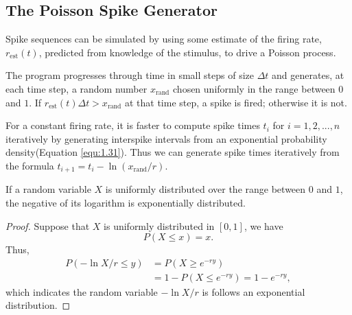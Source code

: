 \subsection{The Poisson Spike Generator}

\begin{rul}%
    Spike sequences can be simulated by using some estimate of the firing rate, $r_\text{est}(t)$, predicted from knowledge of the stimulus,  to drive a Poisson process.
\end{rul}

\begin{alg}
    The program progresses through time in small steps of size $\Delta t$ and generates, at each time step, a random number $x_{\text{rand}}$ chosen uniformly in the range between $0$ and $1$. If $r_{\text{est}}(t)\Delta t > x_{\text{rand}}$ at that time step, a spike is fired; otherwise it is not.
\end{alg}

\begin{alg}
  \label{alg:generator2}
  For a constant firing rate, it is faster to compute spike times $t_i$ for $i=1,2,...,n$ iteratively by generating interspike intervals from an exponential probability density(Equation \ref{equ:1.31}). Thus  we can generate spike times iteratively from the formula $t_{i+1}= t_i-\ln(x_\text{rand}/r)$.
  
\end{alg}
\begin{prop}
  If a random variable $X$ is uniformly distributed over the range between $0$ and $1$, the negative of its logarithm is exponentially distributed.
\end{prop}
\begin{proof}
  Suppose that $X$ is uniformly distributed in $[0,1]$, we have
  \begin{displaymath}
    P(X\leq x) = x.
  \end{displaymath}
  Thus,
  \begin{displaymath}
    \begin{aligned}
      P(-\ln X/r \leq y) &= P(X\geq e^{-ry}) \\
      &= 1 - P(X\leq e^{-ry}) = 1-e^{-ry},
    \end{aligned}
  \end{displaymath}
  which indicates the random variable $-\ln X/r$ is follows an exponential distribution.
\end{proof}\qedhere

